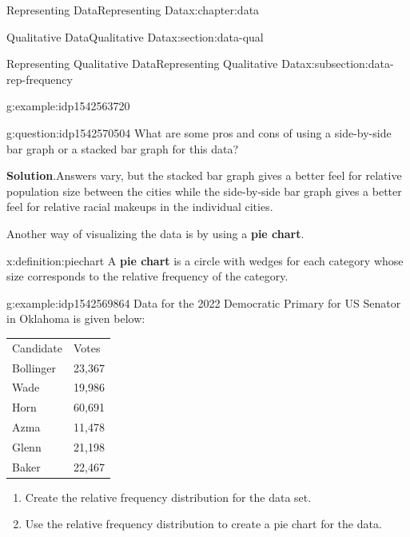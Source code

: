 \documentclass[oneside,10pt,]{book}
\newcommand{\blocktitlefont}{\relax}
\newcommand{\tabularfont}{\relax}
\newcommand{\terminology}[1]{\textbf{#1}}
\begin{document}
\begin{chapterptx}{Representing Data}{}{Representing Data}{}{}{x:chapter:data}
\begin{sectionptx}{Qualitative Data}{}{Qualitative Data}{}{}{x:section:data-qual}
\begin{subsectionptx}{Representing Qualitative Data}{}{Representing Qualitative Data}{}{}{x:subsection:data-rep-frequency}
\begin{example}{}{g:example:idp1542563720}
\begin{image}{0}{1}{0}
{
}%
\end{image}%
%
\end{example}
\begin{question}{}{g:question:idp1542570504}%
What are some pros and cons of using a side-by-side bar graph or a stacked bar graph for this data?%
\par\smallskip%
\noindent\textbf{\blocktitlefont Solution}.\hypertarget{g:solution:idp1542572424}{}\quad{}Answers vary, but the stacked bar graph gives a better feel for relative population size between the cities while the side-by-side bar graph gives a better feel for relative racial makeups in the individual cities.%
\end{question}
Another way of visualizing the data is by using a \terminology{pie chart}.%
\begin{definition}{}{x:definition:piechart}%
A \terminology{pie chart} is a circle with wedges for each category whose size corresponds to the relative frequency of the category.%
%
\end{definition}
\begin{example}{}{g:example:idp1542569864}%
Data for the 2022 Democratic Primary for US Senator in Oklahoma is given below: \begin{center}%
{\tabularfont%
\begin{tabular}{ll}
Candidate&Votes\tabularnewline[0pt]
Bollinger&23,367\tabularnewline[0pt]
Wade&19,986\tabularnewline[0pt]
Horn&60,691\tabularnewline[0pt]
Azma&11,478\tabularnewline[0pt]
Glenn&21,198\tabularnewline[0pt]
Baker&22,467
\end{tabular}
}%
\end{center}%
%
\par
%
\begin{enumerate}[label=\alph*]
\item{}Create the relative frequency distribution for the data set.%
\item{}Use the relative frequency distribution to create a pie chart for the data.%
\end{enumerate}
%
\par\smallskip%

\end{example}
\end{subsectionptx}
\end{sectionptx}
\end{chapterptx}
\end{document}
